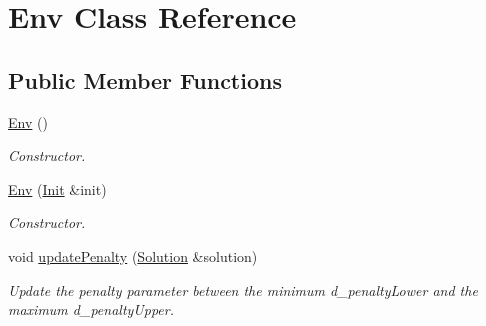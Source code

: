 \hypertarget{class_env}{}\section{Env Class Reference}
\label{class_env}
\subsection*{Public Member Functions}
\begin{DoxyCompactItemize}
\item 
\mbox{\label{class_env_a60054c2be7d109a6d1b740af6896198b}} 
\hyperlink{class_env_a60054c2be7d109a6d1b740af6896198b}{Env} ()
\begin{DoxyCompactList}\small\item\em Constructor. \end{DoxyCompactList}\item 
\hyperlink{class_env_abef807205f56ffe87706b5413c0de75f}{Env} (\hyperlink{class_init}{Init} \&init)
\begin{DoxyCompactList}\small\item\em Constructor. \end{DoxyCompactList}\item 
void \hyperlink{class_env_a05decf6ad0f2370b38fd8c403777a9ca}{update\+Penalty} (\hyperlink{class_solution}{Solution} \&solution)
\begin{DoxyCompactList}\small\item\em Update the penalty parameter between the minimum d\+\_\+penalty\+Lower and the maximum d\+\_\+penalty\+Upper. \end{DoxyCompactList}\end{DoxyCompactItemize}
